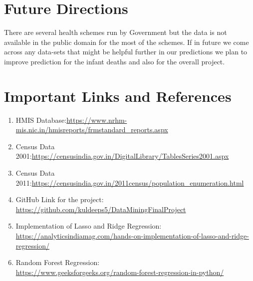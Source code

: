 \documentclass[12pt]{article}
\begin{document}
\section{Future Directions}
There are several health schemes run by Government but the data is not available in the public domain for the most of the schemes. If in future we come across any data-sets that might be helpful further in our predictions we plan to improve prediction for the infant deaths and also for the overall project.

\section{Important Links and References}

\noindent\begin{enumerate}[leftmargin=0cm,itemindent=.5cm,labelwidth=\itemindent,labelsep=0cm,align=left]
\item HMIS Database:\url{https://www.nrhm-mis.nic.in/hmisreports/frmstandard_reports.aspx}
\item Census Data 2001:\url{https://censusindia.gov.in/DigitalLibrary/TablesSeries2001.aspx}
\item Census Data 2011:\url{https://censusindia.gov.in/2011census/population_enumeration.html}
\item GitHub Link for the project: \url{https://github.com/kuldeeps5/DataMiningFinalProject}
\item Implementation of Lasso and Ridge Regression: \\\url{https://analyticsindiamag.com/hands-on-implementation-of-lasso-and-ridge-regression/}
\item Random Forest Regression:\\ \url{https://www.geeksforgeeks.org/random-forest-regression-in-python/}
\end{enumerate}
\end{document}
